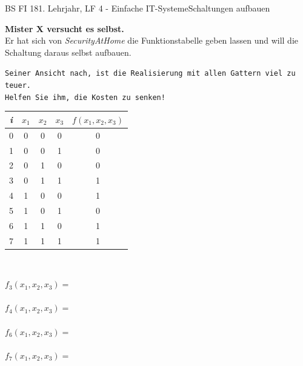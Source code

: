 \documentclass[oneside,openany,headings=optiontotoc,11pt,numbers=noenddot]{scrreprt}
\begin{document}
	\begin{worksheet}{BS FI 18}{1. Lehrjahr, LF 4 - Einfache IT-Systeme}{Schaltungen aufbauen}
		\begin{framed}
			\noindent
			\begin{minipage}{0.58\textwidth}
				\textbf{Mister X versucht es selbst.}\\
				Er hat sich von \textit{SecurityAtHome} die Funktionstabelle geben lassen und will die Schaltung daraus selbst aufbauen.
				\par
				\begin{addmargin}[0.75cm]{0cm}
					\texttt{Seiner Ansicht nach, ist die Realisierung mit allen Gattern viel zu teuer.\\
						Helfen Sie ihm, die Kosten zu senken!}\\
				\end{addmargin}
			\end{minipage}
			\hfill
			\begin{minipage}{0.4\textwidth}
				\begin{tabular}{|c||ccc||c|}
					\hline
					\textit{i} & \(x_1\) & \(x_2\) & \(x_3\) & \(f(x_1,x_2,x_3)\)\\
					\hline
					0 & 0 & 0 & 0 & 0\\
					\hline
					1 & 0 & 0 & 1 & 0\\
					\hline
					2 & 0 & 1 & 0 & 0\\
					\hline
					3 & 0 & 1 & 1 & 1\\
					\hline
					4 & 1 & 0 & 0 & 1\\
					\hline
					5 & 1 & 0 & 1 & 0\\
					\hline
					6 & 1 & 1 & 0 & 1\\
					\hline
					7 & 1 & 1 & 1 & 1\\
					\hline
				\end{tabular}
			\end{minipage}
		\end{framed}
		\begin{framed}
			\noindent
			\tiny{\textit{\color{codegray}{Minterme}}}\\
			\par\noindent\normalsize
			\(f_3(x_1,x_2,x_3) = \)\\
			\\
			\(f_4(x_1,x_2,x_3) = \)\\
			\\
			\(f_6(x_1,x_2,x_3) = \)\\
			\\
			\(f_7(x_1,x_2,x_3) = \)\\

\end{framed}
\end{worksheet}
\end{document}
